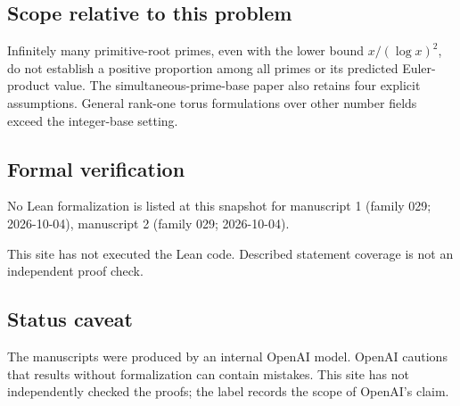 \documentclass[11pt]{article}
\begin{document}
\subsection{Scope relative to this problem}
Infinitely many primitive-root primes, even with the lower bound $x/(\log x)^2$, do not establish a positive proportion among all primes or its predicted Euler-product value. The simultaneous-prime-base paper also retains four explicit assumptions. General rank-one torus formulations over other number fields exceed the integer-base setting.

\subsection{Formal verification}
No Lean formalization is listed at this snapshot for manuscript 1 (family 029; 2026-10-04), manuscript 2 (family 029; 2026-10-04).

This site has not executed the Lean code. Described statement coverage is not an independent proof check.

\subsection{Status caveat}
The manuscripts were produced by an internal OpenAI model. OpenAI cautions that results without formalization can contain mistakes. This site has not independently checked the proofs; the label records the scope of OpenAI's claim.
\end{document}

